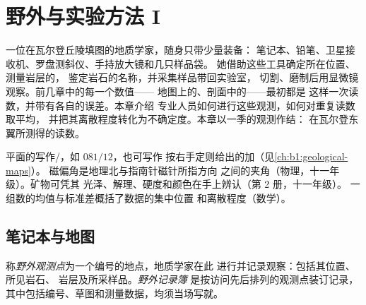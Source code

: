 \chapter{野外与实验方法 I}\label{ch:b1:field-lab-methods-1}

一位在瓦尔登丘陵填图的地质学家，随身只带少量装备：
笔记本、铅笔、卫星接收机、罗盘测斜仪、手持放大镜和几只样品袋。
她借助这些工具确定所在位置、测量岩层的，
鉴定岩石的名称，并采集样品带回实验室，
切割、磨制后用显微镜观察。前几章中的每一个数值——
地图上的、剖面中的——最初都是
这样一次读数，并带有各自的误差。本章介绍
专业人员如何进行这些观测，如何对重复读数取平均，
并把其离散程度转化为不确定度。本章以一季的观测作结：
在瓦尔登东翼所测得的读数。

\begin{recall}
平面的写作/，如 $081/12$，也可写作
按右手定则给出的加（见\cref{ch:b1:geological-maps}）。
磁偏角是地理北与指南针磁针所指方向
之间的夹角（物理，十一年级）。矿物可凭其
光泽、解理、硬度和颜色在手上辨认（第 2 册，十一年级）。
一组数的均值与标准差概括了数据的集中位置
和离散程度（数学）。
\end{recall}

\section{笔记本与地图}

\begin{definition}\label{def:b1:field-lab-methods-1:station}
称\emph{野外观测点}为一个编号的地点，地质学家在此
进行并记录观察：包括其位置、所见岩石、
岩层及所采样品。\emph{野外记录簿}
是按访问先后排列的观测点装订记录，
其中包括编号、草图和测量数据，均须当场写就。
\end{definition}

